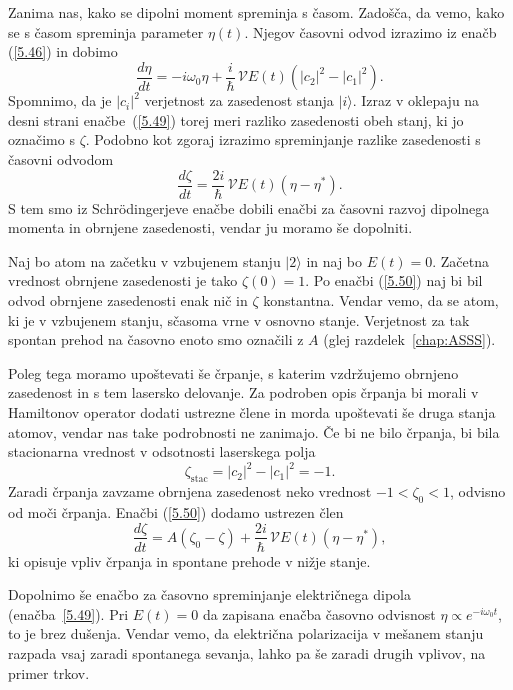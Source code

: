 Zanima nas, kako se dipolni moment spreminja s časom. Zadošča, da vemo, kako se 
s časom spreminja parameter $\eta(t)$. Njegov časovni odvod izrazimo
iz enačb (\ref{5.46}) in dobimo
\begin{equation}  
\label{5.49}
\frac{d\eta}{dt}=- i \omega_0\eta+\frac{i}{\hslash}\,\mathcal{V}E(t) \left(|c_2|^2-|c_1|^2\right).
\end{equation}
Spomnimo, da je $|c_i|^2$ verjetnost za zasedenost stanja $|i\rangle$. Izraz v oklepaju
na desni strani enačbe~(\ref{5.49}) torej meri razliko zasedenosti obeh stanj, ki jo označimo
s $\zeta$. Podobno kot zgoraj izrazimo spreminjanje razlike zasedenosti s časovni odvodom 
\begin{equation}  
\label{5.50}
\frac{d\zeta}{dt}=\frac{2i}{\hslash}\, \mathcal{V} E(t)\left(\eta- \eta^{\ast}\right).
\end{equation}
S tem smo iz Schr\"odingerjeve enačbe dobili enačbi za časovni razvoj
dipolnega momenta in obrnjene zasedenosti, vendar ju moramo še dopolniti.

Naj bo atom na začetku v vzbujenem stanju $|2\rangle$ in naj bo $E(t)=0$. Začetna
vrednost obrnjene zasedenosti je tako $\zeta(0)=1$. Po enačbi (\ref{5.50}) naj bi 
bil odvod obrnjene zasedenosti enak nič in $\zeta$ konstantna. 
Vendar vemo, da se atom, ki je v vzbujenem stanju, sčasoma vrne v
osnovno stanje. Verjetnost za tak spontan prehod na časovno enoto smo označili z $A$ (glej 
razdelek~\ref{chap:ASSS}).

Poleg tega moramo upoštevati še črpanje, s katerim
vzdržujemo obrnjeno zasedenost in s tem lasersko delovanje. Za podroben
opis črpanja bi morali v Hamiltonov operator dodati ustrezne člene in
morda upoštevati še druga stanja atomov, vendar nas take podrobnosti 
ne zanimajo. Če bi ne bilo črpanja, bi bila stacionarna vrednost
v odsotnosti laserskega polja
\begin{equation}
 \zeta_{\mathrm{stac}}= |c_2|^2-|c_1|^2 = -1.
\end{equation}
Zaradi črpanja zavzame obrnjena zasedenost neko vrednost $-1<\zeta_0<1$, 
odvisno od moči črpanja. Enačbi (\ref{5.50}) dodamo ustrezen člen
\begin{equation}  
\label{5.51}
\frac{d\zeta}{dt}=A\left(\zeta_0-\zeta\right)+\frac{2i}{\hslash}\,\mathcal{V}E(t)\left(\eta-\eta^{\ast}\right),
\end{equation}
ki opisuje vpliv črpanja in spontane prehode v nižje stanje. 

Dopolnimo še enačbo za časovno spreminjanje električnega dipola 
(enačba~\ref{5.49}). Pri $E(t)=0$ da zapisana enačba časovno odvisnost 
$\eta \propto e^{-i \omega_0 t}$, to je brez dušenja. Vendar vemo, da električna
polarizacija v mešanem stanju razpada vsaj zaradi spontanega sevanja, lahko
pa še zaradi drugih vplivov, na primer trkov. 

